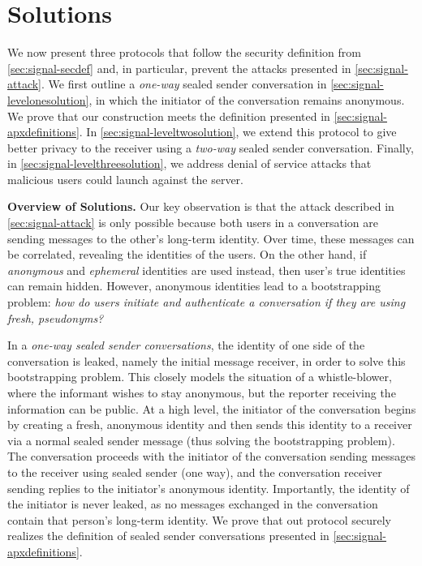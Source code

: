 \section{Solutions}\label{sec:signal-solution}
We now present three protocols that follow the security definition from
\cref{sec:signal-secdef} and, in particular, prevent the attacks presented in \cref{sec:signal-attack}.  We first outline a {\em one-way} sealed sender conversation in \cref{sec:signal-levelonesolution}, in which the initiator of the conversation remains anonymous.  We prove that our construction meets the definition presented in \cref{sec:signal-apxdefinitions}.   In \cref{sec:signal-leveltwosolution}, we extend this protocol to give better privacy to the receiver using a {\em two-way} sealed sender conversation.  Finally, in \cref{sec:signal-levelthreesolution}, we address denial of service attacks that malicious users could launch against the server. 

\medskip \noindent
\textbf{Overview of Solutions.} Our key observation is that the attack described in \cref{sec:signal-attack} is only possible because both users in a conversation are sending messages to the other's long-term identity.  Over time, these messages can be correlated, revealing the identities of the users.
On the other hand, if {\em anonymous} and {\em ephemeral} identities are used instead, then user's true identities can remain hidden.  However, anonymous identities lead to a bootstrapping problem: {\em how do users initiate and authenticate a conversation if they are using fresh, pseudonyms?} 

In a {\em one-way sealed sender conversations}, the identity of one side
of the conversation is leaked, namely the initial message receiver, in
order to solve this bootstrapping problem. This closely models the
situation of a whistle-blower, where the informant wishes to stay
anonymous, but the reporter receiving the information can be public. At
a high level, the initiator of the conversation begins by creating a
fresh, anonymous identity and then sends this identity to a receiver via
a normal sealed sender message (thus solving the bootstrapping problem).
The conversation proceeds with the initiator of the conversation sending
messages to the receiver using sealed sender (one way), and the
conversation receiver sending replies to the initiator's anonymous
identity. Importantly, the identity of the initiator is never leaked, as
no messages exchanged in the conversation contain that person's long-term
identity.  We prove that out protocol securely realizes the definition
of sealed sender conversations presented in
\cref{sec:signal-apxdefinitions}. 

